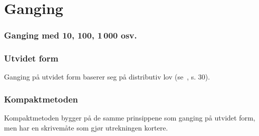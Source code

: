 \section{Ganging}
\subsubsection{Ganging med 10, 100, 1\,000 osv.}
\subsubsection{Utvidet form}
Ganging på utvidet form baserer seg på distributiv lov (se \mb\,, s. 30).
\subsubsection{Kompaktmetoden}
Kompaktmetoden bygger på de samme prinsippene som ganging på utvidet form, men har en skrivemåte som gjør utrekningen kortere.

